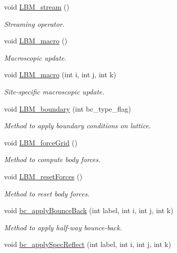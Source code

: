 \begin{DoxyCompactItemize}
void \hyperlink{class_grid_obj_a5b5cb1f3136da8cbff96955d9c6d9e5b}{L\+B\+M\+\_\+stream} ()
\begin{DoxyCompactList}\small\item\em Streaming operator. \end{DoxyCompactList}\item 
void \hyperlink{class_grid_obj_a25382158b7747da7c0639aed513ae39c}{L\+B\+M\+\_\+macro} ()
\begin{DoxyCompactList}\small\item\em Macroscopic update. \end{DoxyCompactList}\item 
void \hyperlink{class_grid_obj_ab69942450175d12c75f4b8d33b06c905}{L\+B\+M\+\_\+macro} (int i, int j, int k)
\begin{DoxyCompactList}\small\item\em Site-\/specific macroscopic update. \end{DoxyCompactList}\item 
void \hyperlink{class_grid_obj_a23d89d6111dd46653b2b1f79a5c7fbf1}{L\+B\+M\+\_\+boundary} (int bc\+\_\+type\+\_\+flag)
\begin{DoxyCompactList}\small\item\em Method to apply boundary conditions on lattice. \end{DoxyCompactList}\item 
void \hyperlink{class_grid_obj_a38db857b219d13ca7b0d35ede87b1536}{L\+B\+M\+\_\+force\+Grid} ()
\begin{DoxyCompactList}\small\item\em Method to compute body forces. \end{DoxyCompactList}\item 
void \hyperlink{class_grid_obj_a5701631be6333e512c7fc8dd6ecabf85}{L\+B\+M\+\_\+reset\+Forces} ()
\begin{DoxyCompactList}\small\item\em Method to reset body forces. \end{DoxyCompactList}\item 
void \hyperlink{class_grid_obj_a2dc94b1d2e3f14a1a086b8bfa078839b}{bc\+\_\+apply\+Bounce\+Back} (int label, int i, int j, int k)
\begin{DoxyCompactList}\small\item\em Method to apply half-\/way bounce-\/back. \end{DoxyCompactList}\item 
void \hyperlink{class_grid_obj_ae1d63a43d1dee6c7b25880c8a9bb97c9}{bc\+\_\+apply\+Spec\+Reflect} (int label, int i, int j, int k)

\end{DoxyCompactItemize}
